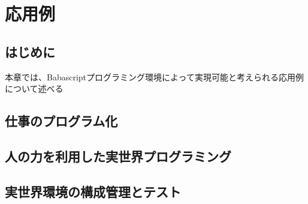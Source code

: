 \chapter{応用例}
\label{chap:application}

\section{はじめに}

本章では、Babascriptプログラミング環境によって実現可能と考えられる応用例について述べる

\section{仕事のプログラム化}
\section{人の力を利用した実世界プログラミング}
\section{実世界環境の構成管理とテスト}
